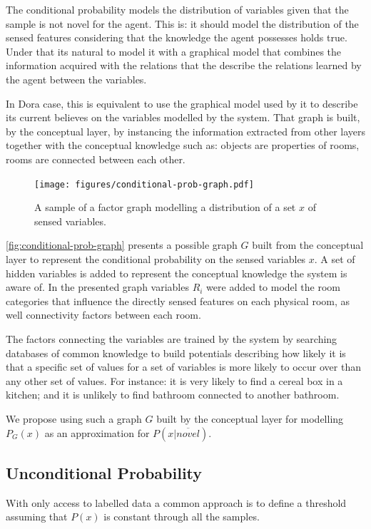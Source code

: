 \documentclass[runningheads,a4paper]{llncs}
\begin{document}
The conditional probability models the distribution of variables given that the sample
is not novel for the agent.
This is: it should model the distribution of the sensed features considering that the
knowledge the agent possesses holds true. Under that its natural to model it with a graphical
model that combines the information acquired with the relations that the describe the
relations learned by the agent between the variables.

In Dora case, this is equivalent to use the graphical model used by it to describe its
current believes on the variables modelled by the system.
That graph is built, by the conceptual layer, by instancing the information extracted from
other layers together with the conceptual knowledge such as: objects are properties of rooms,
rooms are connected between each other.

\begin{figure}[h]
\centering
\texttt{[image: figures/conditional-prob-graph.pdf]}
\caption{\label{fig:conditional-prob-graph}A sample of a factor graph modelling a distribution
         of a set $x$ of sensed variables.}
\end{figure}

\autoref{fig:conditional-prob-graph} presents a possible graph $G$ built from the conceptual
layer to represent the conditional probability on the sensed variables $x$.
A set of hidden variables is added to represent the conceptual knowledge the system is aware of.
In the presented graph variables $R_i$ were added to model the room categories that influence
the directly sensed features on each physical room, as well connectivity factors between each
room.

The factors connecting the variables are trained by the system by searching databases of
common knowledge to build potentials describing how likely it is that a specific set of
values for a set of variables is more likely to occur over than any other set of values.
For instance: it is very likely to find a cereal box in a kitchen; and it is unlikely to find
bathroom connected to another bathroom.

We propose using such a graph $G$ built by the conceptual layer for modelling $P_G(x)$
as an approximation for $P(x|\overline{novel})$.

\subsection{Unconditional Probability}
\label{sec:unconditional-prob}
With only access to labelled data a common approach is to define a threshold assuming
that $P(x)$ is constant through all the samples.
\end{document}
